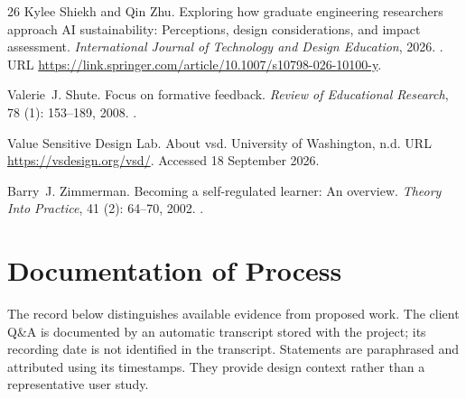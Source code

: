 \documentclass[11pt,a4paper]{article}
\begin{document}
\begin{thebibliography}{26}
Kylee Shiekh and Qin Zhu.
\newblock Exploring how graduate engineering researchers approach {AI}
  sustainability: Perceptions, design considerations, and impact assessment.
\newblock \emph{International Journal of Technology and Design Education},
  2026.
\newblock {}.
\newblock URL
  \url{https://link.springer.com/article/10.1007/s10798-026-10100-y}.

Valerie~J. Shute.
\newblock Focus on formative feedback.
\newblock \emph{Review of Educational Research}, 78 (1):
  153--189, 2008.
\newblock {}.

{Value Sensitive Design Lab}.
\newblock About vsd.
\newblock University of Washington, n.d.
\newblock URL \url{https://vsdesign.org/vsd/}.
\newblock Accessed 18 September 2026.

Barry~J. Zimmerman.
\newblock Becoming a self-regulated learner: An overview.
\newblock \emph{Theory Into Practice}, 41 (2): 64--70, 2002.
\newblock {}.

\end{thebibliography}

\appendix
\clearpage

\section{Documentation of Process}
\label{app:process}
The record below distinguishes available evidence from proposed work. The client Q\&A is documented by an automatic transcript stored with the project; its recording date is not identified in the transcript. Statements are paraphrased and attributed using its timestamps. They provide design context rather than a representative user study.
\end{document}
